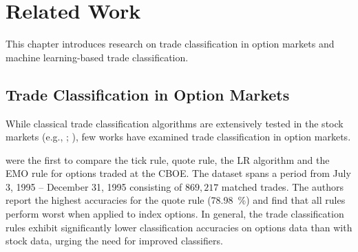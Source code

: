 \section{Related Work}\label{sec:related-work}

This chapter introduces research on trade classification in option markets and machine learning-based trade classification.

\subsection{Trade Classification in Option Markets}
\label{sec:trade-classification-in-option-markets}

While classical trade classification algorithms are extensively tested in the stock markets (e.g., \textcite[][3806--3821]{chakrabartyTradeClassificationAlgorithms2012}; \textcite[][259--286]{odders-whiteOccurrenceConsequencesInaccurate2000}), few works have examined trade classification in option markets.

\textcite[882--883]{savickasInferringDirectionOption2003} were the first to compare the tick rule, quote rule, the \gls{LR} algorithm and the \gls{EMO} rule for options traded at the \gls{CBOE}. The dataset spans a period from July 3, 1995 -- December 31, 1995 consisting of $869{,}217$ matched trades. The authors report the highest accuracies for the quote rule (\SI{78.98}{\percent}) and find that all rules perform worst when applied to index options. In general, the trade classification rules exhibit significantly lower classification accuracies on options data than with stock data, urging the need for improved classifiers.

